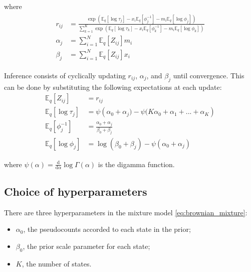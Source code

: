\documentclass{article}
\newcommand{\D}{\text{d}}
\begin{document}
where
\begin{align}\begin{split}
    r_{ij} &= \frac{
        \exp \left(
            \mathbb{E}_{q} \left[ \log \tau_{j} \right] - x_{i} \mathbb{E}_{q} \left[ \phi_{j}^{-1} \right] - m_{i} \mathbb{E}_{q} \left[ \log \phi_{j} \right]
        \right)
    }{
        \sum\limits_{k=1}^{K} \exp \left(
            \mathbb{E}_{q} \left[ \log \tau_{k} \right] - x_{i} \mathbb{E}_{q} \left[ \phi_{k}^{-1} \right] - m_{i} \mathbb{E}_{q} \left[ \log \phi_{k} \right]
        \right)
    } \\
    \alpha_{j} &= \sum\limits_{i=1}^{N} \mathbb{E}_{q} \left[ Z_{ij} \right] m_{i} \\
    \beta_{j} &= \sum\limits_{i=1}^{N} \mathbb{E}_{q} \left[ Z_{ij} \right] x_{i}
\end{split}\end{align}

Inference consists of cyclically updating $r_{ij}$, $\alpha_{j}$, and $\beta_{j}$
until convergence. This can be done by substituting the following expectations at each update:
\begin{align*}
    \mathbb{E}_{q} \left[ Z_{ij} \right] &= r_{ij} \\
    \mathbb{E}_{q} \left[ \log \tau_{j} \right] &= \psi \left( \alpha_{0} + \alpha_{j}) - \psi (K \alpha_{0} + \alpha_{1} + ... + \alpha_{K} \right) \\
    \mathbb{E}_{q} \left[ \phi_{j}^{-1} \right] &= \frac{\alpha_{0} + \alpha_{j}}{\beta_{0} + \beta_{j}} \\
    \mathbb{E}_{q} \left[ \log \phi_{j} \right] &= \log (\beta_{0} + \beta_{j}) - \psi (\alpha_{0} + \alpha_{j})
\end{align*}

where $\psi(\alpha) = \frac{\D}{\D \alpha} \log \Gamma (\alpha)$ is the digamma function.

\subsection{Choice of hyperparameters}

There are three hyperparameters in the mixture model \ref{eq:brownian_mixture}:
\begin{itemize}
    \item $\alpha_{0}$, the pseudocounts accorded to each state in the prior;
    \item $\beta_{0}$, the prior scale parameter for each state;
    \item $K$, the number of states.
\end{itemize}
\end{document}

